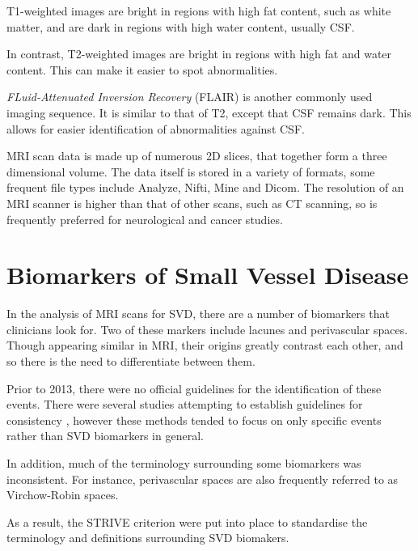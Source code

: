 T1-weighted images are bright in regions with high fat content, such as white matter, and are dark in regions with high water content, usually CSF.

In contrast, T2-weighted images are bright in regions with high fat and water content. This can make it easier to spot abnormalities.

\textit{FLuid-Attenuated Inversion Recovery} (FLAIR) is another commonly used imaging sequence. It is similar to that of T2, except that CSF remains dark. This allows for easier identification of abnormalities against CSF.


MRI scan data is made up of numerous 2D slices, that together form a three dimensional volume. The data itself is stored in a variety of formats, some frequent file types include Analyze, Nifti, Mine and Dicom. The resolution of an MRI scanner is higher than that of other scans, such as CT scanning, so is frequently preferred for neurological and cancer studies.

\section{Biomarkers of Small Vessel Disease}\label{svd-markers}

In the analysis of MRI scans for SVD, there are a number of biomarkers that clinicians look for. Two of these markers include lacunes and perivascular spaces. Though appearing similar in MRI, their origins greatly contrast each other, and so there is the need to differentiate between them.

Prior to 2013, there were no official guidelines for the identification of these events. There were several studies attempting to establish guidelines for consistency \cite{PotterGillian2015CPSV, AdamsH.H.Hieab2013RMfD}, however these methods tended to focus on only specific events rather than SVD biomarkers in general.

In addition, much of the terminology surrounding some biomarkers was inconsistent. For instance, perivascular spaces are also frequently referred to as Virchow-Robin spaces\cite{WardlawJ.M.2013Nsfr, AdamsH.H.Hieab2013RMfD}.

As a result, the STRIVE criterion \cite{WardlawJ.M.2013Nsfr} were put into place to standardise the terminology and definitions surrounding SVD biomakers.


